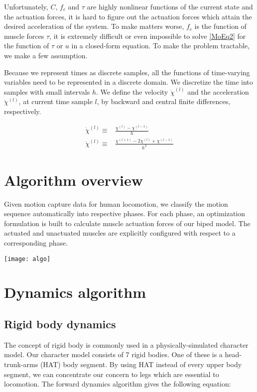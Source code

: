\documentclass[a4paper,10pt]{article}
\begin{document}
Unfortunately, $C$, $f_c$ and $\tau$ are highly nonlinear functions of the current state and the
actuation forces, it is hard to figure out the actuation forces which attain
the desired acceleration of the system. To make matters worse, $f_c$ is the function
of muscle forces $\tau$, it is extremely difficult or even impossible
to solve \eqref{MoEq2} for the function of $\tau$ or $u$ in a closed-form
equation.
To make the problem tractable, we make a few assumption. 

Because we represent times as discrete samples, all the functions of
time-varying variables need to be represented in a discrete domain.
We discretize the time into samples with small intervals $h$. We define
the velocity $\dot\chi^{(l)}$ and the acceleration $\ddot\chi^{(l)}$, at current
time sample $l$, by backward and central finite differences, respectively.

\begin{align}
\dot\chi^{(l)}  \equiv {} & \frac{\chi^{(l)}-\chi^{(l-1)}}{h}\label{vel-dis}\\
\ddot\chi^{(l)} \equiv {} & \frac{\chi^{(l+1)}-2\chi^{(l)}+\chi^{(l-1)}}{h^2}\label{acc-dis}
\end{align}


\pagebreak

\section{Algorithm overview}

Given motion capture data for human locomotion, we classify the motion
sequence automatically into respective phases. For each phase,
an optimization formulation is built to calculate muscle actuation forces
of our biped model. The actuated and unactuated muscles are explicitly configured
with respect to a corresponding phase.


\texttt{[image: algo]}

\pagebreak

\section{Dynamics algorithm}

\subsection{Rigid body dynamics}

The concept of rigid body is commonly used in a physically-simulated
character model.
Our character model consists of 7 rigid bodies. One of these is
a head-trunk-arms (HAT) body segment. By using HAT instead of every upper body
segment, we can concentrate our concern to legs which are essential to
locomotion. The forward dynamics algorithm gives the following equation:
\end{document}

